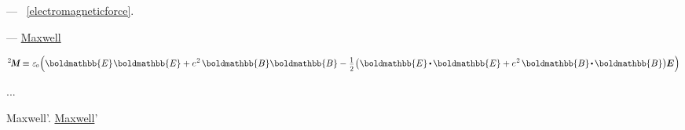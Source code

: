 \vspace{-0.1em} \noindent --- ~\eqref{electromagneticforce}.


 \:---  \href{https://en.wikipedia.org/wiki/Maxwell_stress_tensor}{Maxwell}

\nopagebreak\vspace{-0.2em}\begin{equation}\label{maxwellstresstensor:definition}
\maxwellstress \equiv \hspace{.12ex}
\vacuumpermittivity \hspace{-0.33ex} \left(
\boldmathbb{E} \hspace{.1ex} \boldmathbb{E} + c^{\hspace{.16ex}2} \hspace{.3ex} \boldmathbb{B} \boldmathbb{B}
- \hspace{.1ex} \smalldisplaystyleonehalf \hspace{.1ex} \bigl( \hspace{.1ex} \boldmathbb{E} \hspace{-0.1ex} \dotp \hspace{-0.15ex} \boldmathbb{E} + c^{\hspace{.16ex}2} \hspace{.3ex} \boldmathbb{B} \hspace{-0.2ex} \dotp \hspace{-0.16ex} \boldmathbb{B} \bigr) \hspace{-0.06ex} \bm{E} \hspace{.05ex}
\right)
\end{equation}

...

  Maxwell’.
\href{https://en.wikipedia.org/wiki/James_Clerk_Maxwell}{Maxwell}’ 

